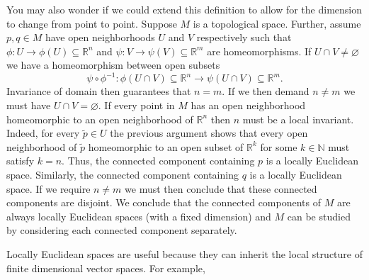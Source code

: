 You may also wonder if we could extend this definition to allow for the dimension to change from point to point. Suppose $M$ is a topological space. Further, assume $p,q\in M$ have open neighborhoods $U$ and $V$ respectively such that $\phi:U\rightarrow\phi(U)\subseteq\mathbb{R}^n$ and $\psi:V\rightarrow\psi(V)\subseteq\mathbb{R}^m$ are homeomorphisms. If $U\cap V\neq\varnothing$ we have a homeomorphism between open subsets 
\begin{equation}
\psi\circ\phi^{-1}:\phi(U\cap V)\subseteq\mathbb{R}^n\rightarrow \psi(U\cap V)\subseteq\mathbb{R}^m.
\end{equation}
Invariance of domain then guarantees that $n=m$. If we then demand $n\neq m$ we must have $U\cap V=\varnothing$. If every point in $M$ has an open neighborhood homeomorphic to an open neighborhood of $\mathbb{R}^n$ then $n$ must be a local invariant. Indeed, for every $\tilde{p}\in U$ the previous argument shows that every open neighborhood of $\tilde{p}$ homeomorphic to an open subset of $\mathbb{R}^k$ for some $k\in\mathbb{N}$ must satisfy $k=n$. Thus, the connected component containing $p$ is a locally Euclidean space. Similarly, the connected component containing $q$ is a locally Euclidean space. If we require $n\neq m$ we must then conclude that these connected components are disjoint. We conclude that the connected components of $M$ are always locally Euclidean spaces (with a fixed dimension) and $M$ can be studied by considering each connected component separately.

Locally Euclidean spaces are useful because they can inherit the local structure of finite dimensional vector spaces. For example, 

 